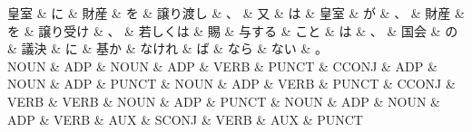 \documentclass[tikz,border=5pt]{standalone}
\begin{document}
\small
\begin{dependency}[edge unit distance=12.0pt]
    \begin{deptext}[column sep=0.5em]
        皇室 \& に \& 財産 \& を \& 譲り渡し \& 、 \& 又 \& は \& 皇室 \& が \& 、 \& 財産 \& を \& 譲り受け \& 、 \& 若しくは \& 賜 \& 与する \& こと \& は \& 、 \& 国会 \& の \& 議決 \& に \& 基か \& なけれ \& ば \& なら \& ない \& 。\\
        NOUN \& ADP \& NOUN \& ADP \& VERB \& PUNCT \& CCONJ \& ADP \& NOUN \& ADP \& PUNCT \& NOUN \& ADP \& VERB \& PUNCT \& CCONJ \& VERB \& VERB \& NOUN \& ADP \& PUNCT \& NOUN \& ADP \& NOUN \& ADP \& VERB \& AUX \& SCONJ \& VERB \& AUX \& PUNCT\\
    \end{deptext}
\end{dependency}
\end{document}
